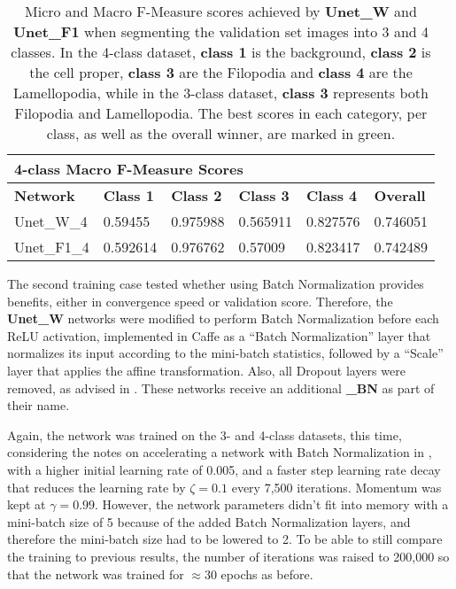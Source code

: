 \begin {table}
\begin{flushleft}
\begin {tabular}[!ht]{|l|l|l|l|l|l|}
			\multicolumn{6}{|l|}{\textbf{4-class Macro F-Measure Scores}} \\ \hline
			\textbf{Network}& \textbf{Class 1}& \textbf{Class 2}& \textbf{Class 3}& \textbf{Class 4}& \textbf{Overall} \\ \hline
			Unet\_W\_4& \cellcolor{green!25}0.59455& 0.975988& 0.565911& \cellcolor{green!25}0.827576& \cellcolor{green!25}0.746051 \\ \hline
			Unet\_F1\_4& 0.592614& \cellcolor{green!25}0.976762& \cellcolor{green!25}0.57009& 0.823417& 0.742489 \\ \hline
		\end {tabular}
	\end {flushleft}

\caption[Micro and Macro F-Measure scores for \textbf{Unet\_W} and \textbf{Unet\_F1}.]{Micro and Macro F-Measure scores achieved by \textbf{Unet\_W} and \textbf{Unet\_F1} when segmenting the validation set images into 3 and 4 classes. In the 4-class dataset, \textbf{class 1} is the background, \textbf{class 2} is the cell proper, \textbf{class 3} are the Filopodia and \textbf{class 4} are the Lamellopodia, while in the 3-class dataset, \textbf{class 3} represents both Filopodia and Lamellopodia. The best scores in each category, per class, as well as the overall winner, are marked in green.}
\label{tab:results1}
\end {table}

\noindent The second training case tested whether using Batch Normalization provides benefits, either in convergence speed or validation score. Therefore, the \textbf{Unet\_W} networks were modified to perform Batch Normalization before each ReLU activation, implemented in Caffe as a ``Batch Normalization'' layer that normalizes its input according to the mini-batch statistics, followed by a ``Scale'' layer that applies the affine transformation. Also, all Dropout layers were removed, as advised in \cite{batchnorm}. These networks receive an additional \textbf{\_BN} as part of their name.

Again, the network was trained on the 3- and 4-class datasets, this time, considering the notes on accelerating a network with Batch Normalization in \cite{batchnorm}, with a higher initial learning rate of 0.005, and a faster step learning rate decay that reduces the learning rate by $\zeta = 0.1$ every 7,500 iterations. Momentum was kept at $\gamma = 0.99$. However, the network parameters didn't fit into memory with a mini-batch size of 5 because of the added Batch Normalization layers, and therefore the mini-batch size had to be lowered to 2. To be able to still compare the training to previous results, the number of iterations was raised to 200,000 so that the network was trained for $\approx$30 epochs as before.

